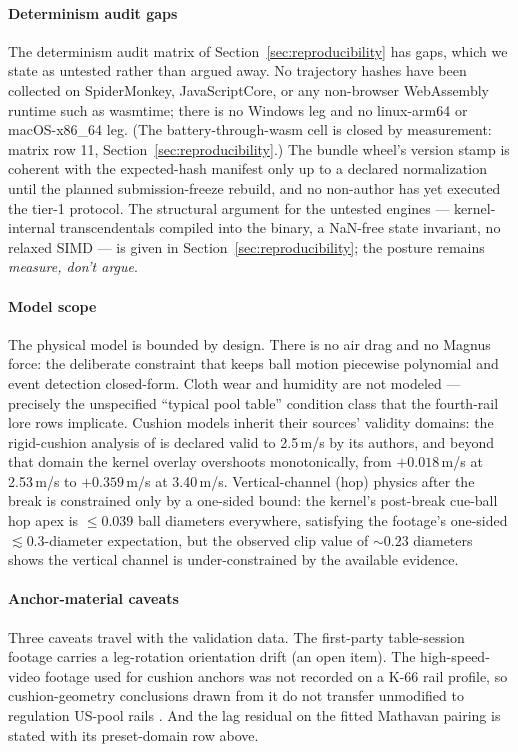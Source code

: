 \paragraph{Determinism audit gaps}
The determinism audit matrix of Section~\ref{sec:reproducibility} has
gaps, which we state as untested rather than argued away. No trajectory
hashes have been collected on SpiderMonkey, JavaScriptCore, or any
non-browser WebAssembly runtime such as wasmtime; there is no Windows leg
and no linux-arm64 or macOS-x86\_64 leg. (The battery-through-wasm cell
is closed by measurement: matrix row 11,
Section~\ref{sec:reproducibility}.) The bundle wheel's version stamp
is coherent with the expected-hash manifest only up to a declared
normalization until the planned submission-freeze rebuild, and no
non-author has yet executed the tier-1 protocol. The structural argument
for the untested engines --- kernel-internal transcendentals compiled
into the binary, a NaN-free state invariant, no relaxed SIMD
\citep{wasm2015nondeterminism} --- is given in
Section~\ref{sec:reproducibility}; the posture remains \emph{measure,
don't argue}.

\paragraph{Model scope}
The physical model is bounded by design. There is no air drag and no
Magnus force: the deliberate constraint that keeps ball motion piecewise
polynomial and event detection closed-form. Cloth wear and humidity are
not modeled --- precisely the unspecified ``typical pool table''
condition class that the fourth-rail lore rows implicate. Cushion models inherit their sources'
validity domains: the rigid-cushion analysis of
\citet{mathavan2010cushion} is declared valid to 2.5\,m/s by its authors,
and beyond that domain the kernel overlay overshoots monotonically, from
$+0.018$\,m/s at 2.53\,m/s to $+0.359$\,m/s at 3.40\,m/s. Vertical-channel (hop) physics after the
break is constrained only by a one-sided bound: the kernel's post-break
cue-ball hop apex is $\leq 0.039$ ball diameters everywhere, satisfying
the footage's one-sided $\lesssim 0.3$-diameter expectation, but the
observed clip value of $\sim 0.23$ diameters shows the vertical channel
is under-constrained by the available evidence.

\paragraph{Anchor-material caveats}
Three caveats travel with the validation data. The first-party
table-session footage carries a leg-rotation orientation drift (an open
item). The high-speed-video footage used for cushion anchors was
not recorded on a K-66 rail profile, so cushion-geometry conclusions
drawn from it do not transfer unmodified to regulation US-pool rails
\citep{alciatore_hsv_catalog}. And the lag residual on the fitted
Mathavan pairing is stated with its preset-domain row above.

